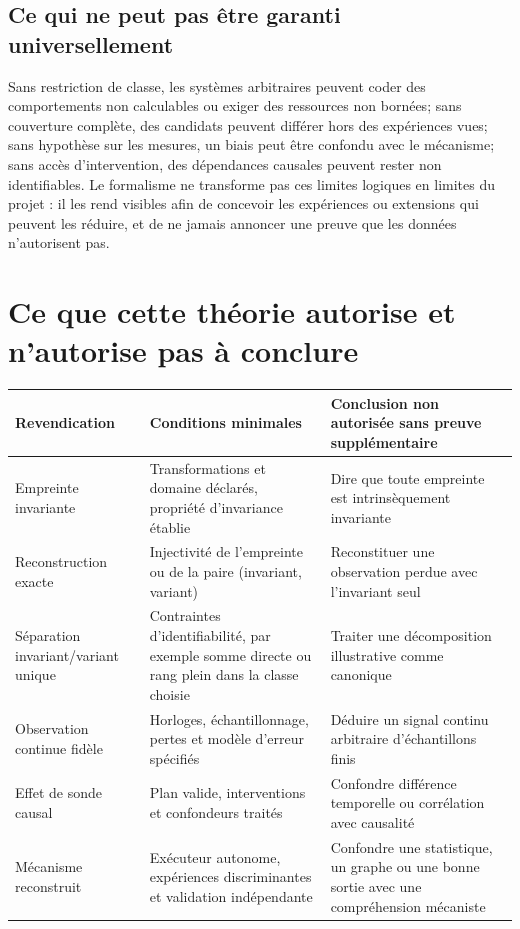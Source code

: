 \documentclass[11pt,oneside]{book}
\theoremstyle{definition}
\theoremstyle{remark}
\newcommand{\1}{\mathbf 1}
\begin{document}
\section{Ce qui ne peut pas être garanti universellement}
Sans restriction de classe, les systèmes arbitraires peuvent coder des comportements non calculables ou exiger des ressources non bornées; sans couverture complète, des candidats peuvent différer hors des expériences vues; sans hypothèse sur les mesures, un biais peut être confondu avec le mécanisme; sans accès d'intervention, des dépendances causales peuvent rester non identifiables. Le formalisme ne transforme pas ces limites logiques en limites du projet : il les rend visibles afin de concevoir les expériences ou extensions qui peuvent les réduire, et de ne jamais annoncer une preuve que les données n'autorisent pas.

\chapter{Ce que cette théorie autorise et n'autorise pas à conclure}
\begin{longtable}{p{}p{}p{}}
\toprule Revendication & Conditions minimales & Conclusion non autorisée sans preuve supplémentaire \\\midrule
\endhead
Empreinte invariante & Transformations et domaine déclarés, propriété d'invariance établie & Dire que toute empreinte est intrinsèquement invariante \\
Reconstruction exacte & Injectivité de l'empreinte ou de la paire (invariant, variant) & Reconstituer une observation perdue avec l'invariant seul \\
Séparation invariant/variant unique & Contraintes d'identifiabilité, par exemple somme directe ou rang plein dans la classe choisie & Traiter une décomposition illustrative comme canonique \\
Observation continue fidèle & Horloges, échantillonnage, pertes et modèle d'erreur spécifiés & Déduire un signal continu arbitraire d'échantillons finis \\
Effet de sonde causal & Plan valide, interventions et confondeurs traités & Confondre différence temporelle ou corrélation avec causalité \\
Mécanisme reconstruit & Exécuteur autonome, expériences discriminantes et validation indépendante & Confondre une statistique, un graphe ou une bonne sortie avec une compréhension mécaniste \\
\bottomrule
\end{longtable}
\end{document}
